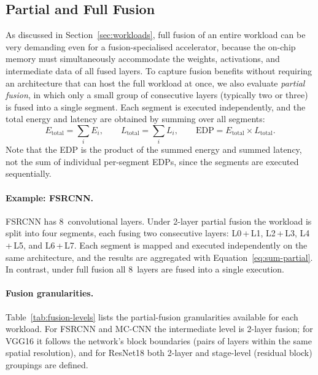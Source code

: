 \subsection{Partial and Full Fusion}
\label{sec:partial-full-fusion}

As discussed in Section~\ref{sec:workloads}, full fusion of an entire
workload can be very demanding even for a fusion-specialised
accelerator, because the on-chip memory must simultaneously
accommodate the weights, activations, and intermediate data of all
fused layers.
To capture fusion benefits without requiring an architecture that can
host the full workload at once, we also evaluate \emph{partial fusion},
in which only a small group of consecutive layers (typically two or
three) is fused into a single segment.
Each segment is executed independently, and the total energy and latency
are obtained by summing over all segments:
%
\begin{equation}
  E_{\text{total}} = \sum_{i} E_{i},
  \qquad
  L_{\text{total}} = \sum_{i} L_{i},
  \qquad
  \text{EDP} = E_{\text{total}} \times L_{\text{total}}.
  \label{eq:sum-partial}
\end{equation}
%
Note that the EDP is the product of the summed energy and summed
latency, not the sum of individual per-segment EDPs, since the
segments are executed sequentially.

\paragraph{Example: FSRCNN.}
FSRCNN has 8~convolutional layers.
Under 2-layer partial fusion the workload is split into four segments,
each fusing two consecutive layers: L0\,+\,L1, L2\,+\,L3, L4\,+\,L5,
and L6\,+\,L7.
Each segment is mapped and executed independently on the same
architecture, and the results are aggregated with
Equation~\eqref{eq:sum-partial}.
In contrast, under full fusion all 8~layers are fused into a single
execution.

\paragraph{Fusion granularities.}
Table~\ref{tab:fusion-levels} lists the partial-fusion granularities
available for each workload.
For FSRCNN and MC-CNN the intermediate level is 2-layer fusion;
for VGG16 it follows the network's block boundaries (pairs of layers
within the same spatial resolution), and for ResNet18 both 2-layer and
stage-level (residual block) groupings are defined.

